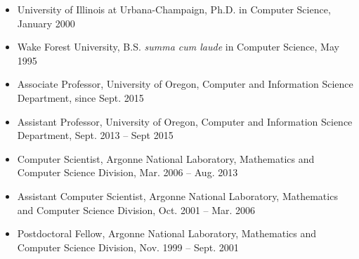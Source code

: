 
\begin{itemize}
\setlength{\itemsep}{0.2pt}
\item
University of Illinois at Urbana-Champaign, Ph.D. in Computer Science, January 2000
\item
Wake Forest University, B.S. {\it summa cum laude} in Computer Science, May 1995
\end{itemize}


\begin{itemize}
\setlength{\itemsep}{0.2pt}
\item

Associate Professor, University of Oregon, 
Computer and Information Science Department, since Sept. 2015

\item
Assistant Professor, University of Oregon, 
Computer and Information Science Department, Sept. 2013 -- Sept 2015

\item 
Computer Scientist, Argonne National Laboratory,
Mathematics and Computer Science Division, Mar. 2006 -- Aug. 2013

\item 
Assistant Computer Scientist, Argonne National Laboratory,
Mathematics and Computer Science Division, Oct. 2001 -- Mar. 2006

\item
Postdoctoral Fellow, Argonne National Laboratory,
Mathematics and Computer Science Division, Nov. 1999 -- Sept. 2001

\end{itemize}


